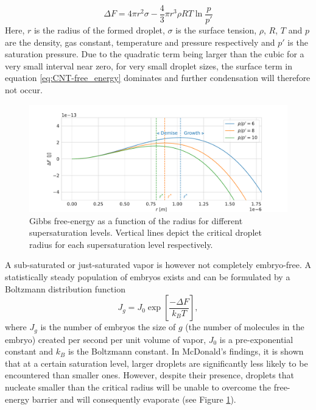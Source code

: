 \documentclass[12pt]{article}
\numberwithin{equation}{section}
\begin{document}
\begin{equation}\label{eq:CNT-free_energy}
    \Delta F=4\pi r^{2}\sigma-\frac{4}{3}\pi r^{3}\rho RT \ln\frac{p}{p'}
\end{equation}
Here, $r$ is the radius of the formed droplet, $\sigma$ is the surface tension, $\rho$, $R$, $T$ and $p$ are the density, gas constant, temperature and pressure respectively and $p'$ is the saturation pressure. Due to the quadratic term being larger than the cubic for a very small interval near zero, for very small droplet sizes, the surface term in equation \ref{eq:CNT-free_energy} dominates and further condensation will therefore not occur.
\begin{figure}[h!]
    \centering
    
    \includegraphics[width=1\textwidth]{Figures/crit_rad_homo.pdf}
    \caption{Gibbs free-energy as a function of the radius for different supersaturation levels. Vertical lines depict the critical droplet radius for each supersaturation level respectively.}
    \label{f:crit_radius for supersat}
\end{figure}
A sub-saturated or just-saturated vapor is however not completely embryo-free. A statistically steady population of embryos exists and can be formulated by a Boltzmann distribution function \cite{mcdonald1962homogeneous}
\begin{equation}\label{eq:CNT stat distribution}
    J_{g}=J_{0}\exp\left[\frac{-\Delta F}{k_{B}T}\right],
\end{equation}
where $J_{g}$ is the number of embryos the size of $g$ (the number of molecules in the embryo) created per second per unit volume of vapor, $J_{0}$ is a pre-exponential constant and $k_{B}$ is the Boltzmann constant. In McDonald's findings, it is shown that at a certain saturation level, larger droplets are significantly less likely to be encountered than smaller ones. However, despite their presence, droplets that nucleate smaller than the critical radius will be unable to overcome the free-energy barrier and will consequently evaporate (see Figure \ref{f:crit_radius for supersat}).
\end{document}
